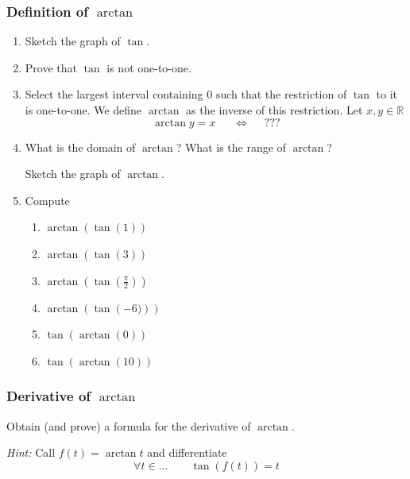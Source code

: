 \begin{frame}[t]
	\fontsize{13}{13}\selectfont
	\frametitle{Definition of $\arctan$}

	\begin{enumerate}
		\item Sketch the graph of $\tan$.

		\item Prove that $\tan$ is not one-to-one.

		\item Select the largest interval containing $0$ such that the restriction of
			$\tan$ to it is one-to-one. We define $\arctan$ as the inverse of this
			restriction. \quad Let $x, y \in \mathbb{R}$
			\[
				\arctan y = x \; \quad \; \iff \; \quad ???
			\]

		\item What is the domain of $\displaystyle \arctan$? What is the range of
			$\displaystyle \arctan$?

			Sketch the graph of $\arctan$.

		\item Compute
			\begin{multicols}{2}
				\begin{enumerate}
					\item $\displaystyle \arctan \left( \tan \left( 1 \right) \right)$

					\item $\displaystyle \arctan \left( \tan \left( 3\right) \right)$

					\item $\displaystyle \arctan \left( \tan \left( \frac{\pi}{2}\right) \right
						)$

					\item $\displaystyle \arctan \left( \tan \left( -6)\right) \right)$

					\item $\displaystyle \tan \left( \arctan \left( 0\right) \right)$

					\item $\displaystyle \tan \left( \arctan \left( 10\right) \right)$
				\end{enumerate}
			\end{multicols}
	\end{enumerate}
\end{frame}

\begin{frame}[t]
	\frametitle{Derivative of $\arctan$}

	\begin{block}{}
		Obtain (and prove) a formula for the derivative of $\arctan$.
	\end{block}

	\emph{Hint:} Call $\displaystyle f(t) = \arctan t$ and differentiate
	\[
		\forall t \in \ldots \quad \quad \tan ( f(t)) = t
	\]
\end{frame}

